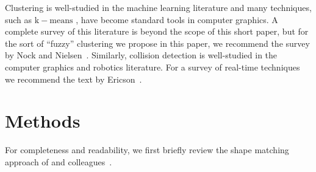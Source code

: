 \documentclass[review]{acmsiggraph}
\begin{document}
Clustering is well-studied in the machine learning literature and many techniques, such as $\mathrm{k-means}$ , have become standard tools in computer graphics.  
A complete survey of this literature is beyond the scope of this short paper, but for the sort of ``fuzzy'' clustering we propose in this paper,
we recommend the survey by Nock and Nielsen~.  Similarly, collision detection is well-studied in the 
computer graphics and robotics literature.  For a survey of real-time techniques we recommend the text by Ericson~.

\section{Methods}
For completeness and readability, we first briefly review the shape matching approach of \Mueller and colleagues~.
\end{document}
